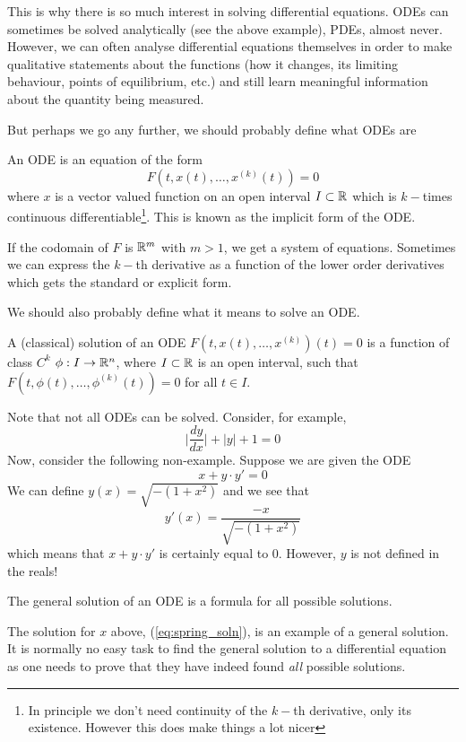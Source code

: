 This is why there is so much interest in solving differential equations. ODEs can sometimes be solved analytically (see the above example), PDEs, almost never. However, we can often analyse differential equations themselves in order to make qualitative statements about the functions (how it changes, its limiting behaviour, points of equilibrium, etc.) and still learn meaningful information about the quantity being measured.

But perhaps we go any further, we should probably define what ODEs are
\begin{definition}
An ODE is an equation of the form
$$ F(t, x(t), \dots, x^{(k)}(t)) = 0 $$
where $x$ is a vector valued function on an open interval $I \subset \mathbb{R}$ which is $k-$times continuous differentiable\footnote{In principle we don't need continuity of the $k-$th derivative, only its existence. However this does make things a lot nicer}. This is known as the implicit form of the ODE.
\end{definition}
If the codomain of $F$ is $\mathbb{R}^m$ with $m > 1$, we get a system of equations. Sometimes we can express the $k-$th derivative as a function of the lower order derivatives which gets the standard or explicit form.

We should also probably define what it means to solve an ODE.
\begin{definition}
A (classical) solution of an ODE $F(t, x(t), \dots, x^{(k)})(t) = 0$ is a function of class $C^k$ $\phi: I \to \mathbb{R}^n$, where $I \subset \mathbb{R}$ is an open interval, such that $F(t, \phi(t), \dots, \phi^{(k)}(t)) = 0$ for all $t \in I$.
\end{definition}
Note that not all ODEs can be solved. Consider, for example,
$$ \bigg|\frac{dy}{dx}\bigg| + |y| + 1 = 0 $$
Now, consider the following non-example. Suppose we are given the ODE
\begin{equation*}
    x + y \cdot y' = 0
\end{equation*}
We can define $y(x) = \sqrt{-(1 + x^2)}$ and we see that 
$$ y'(x) = \frac{-x}{\sqrt{-(1 + x^2)}} $$
which means that $x + y \cdot y'$ is certainly equal to 0. However, $y$ is not defined in the reals!

\begin{definition}
The general solution of an ODE is a formula for all possible solutions.
\end{definition}
The solution for $x$ above, (\ref{eq:spring_soln}), is an example of a general solution. It is normally no easy task to find the general solution to a differential equation as one needs to prove that they have indeed found \textit{all} possible solutions.

